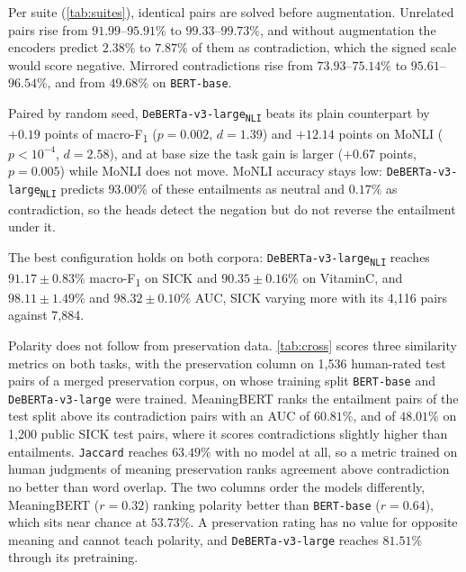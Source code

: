 \documentclass[11pt]{article}
\begin{document}




Per suite (\autoref{tab:suites}), identical pairs are solved before augmentation.
Unrelated pairs rise from $91.99$--$95.91\%$ to $99.33$--$99.73\%$, and without augmentation the encoders predict $2.38\%$ to $7.87\%$ of them as contradiction, which the signed scale would score negative.
Mirrored contradictions rise from $73.93$--$75.14\%$ to $95.61$--$96.54\%$, and from $49.68\%$ on \texttt{BERT-base}.



Paired by random seed, \texttt{DeBERTa-v3-large\textsubscript{NLI}} beats its plain counterpart by $+0.19$ points of macro-F\textsubscript{1} ($p = 0.002$, $d = 1.39$) and $+12.14$ points on MoNLI ($p < 10^{-4}$, $d = 2.58$), and at base size the task gain is larger ($+0.67$ points, $p = 0.005$) while MoNLI does not move.
MoNLI accuracy stays low: \texttt{DeBERTa-v3-large\textsubscript{NLI}} predicts $93.00\%$ of these entailments as neutral and $0.17\%$ as contradiction, so the heads detect the negation but do not reverse the entailment under it.

The best configuration holds on both corpora: \texttt{DeBERTa-v3-large\textsubscript{NLI}} reaches $91.17 \pm 0.83\%$ macro-F\textsubscript{1} on SICK and $90.35 \pm 0.16\%$ on VitaminC, and $98.11 \pm 1.49\%$ and $98.32 \pm 0.10\%$ AUC, SICK varying more with its 4{,}116 pairs against 7{,}884.

Polarity does not follow from preservation data.
\autoref{tab:cross} scores three similarity metrics on both tasks, with the preservation column on 1{,}536 human-rated test pairs of a merged preservation corpus, on whose training split \texttt{BERT-base} and \texttt{DeBERTa-v3-large} were trained.
MeaningBERT ranks the entailment pairs of the test split above its contradiction pairs with an AUC of $60.81\%$, and of $48.01\%$ on 1{,}200 public SICK test pairs, where it scores contradictions slightly higher than entailments.
\texttt{Jaccard} reaches $63.49\%$ with no model at all, so a metric trained on human judgments of meaning preservation ranks agreement above contradiction no better than word overlap.
The two columns order the models differently, MeaningBERT ($r = 0.32$) ranking polarity better than \texttt{BERT-base} ($r = 0.64$), which sits near chance at $53.73\%$.
A preservation rating has no value for opposite meaning and cannot teach polarity, and \texttt{DeBERTa-v3-large} reaches $81.51\%$ through its pretraining.
\end{document}
